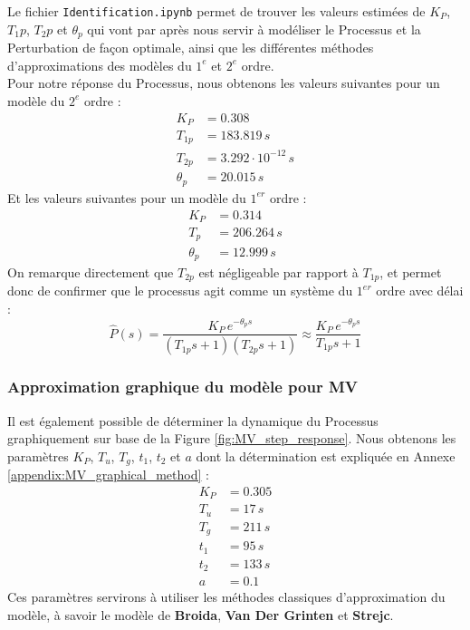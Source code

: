 \documentclass{article}
\begin{document}
Le fichier \texttt{Identification.ipynb} permet de trouver les valeurs estimées de $K_P$, $T_1p$, $T_2p$ et $\theta_p$ qui vont par après nous servir à modéliser le Processus et la Perturbation de façon optimale, ainsi que les différentes méthodes d'approximations des modèles du $1^{e}$ et $2^{e}$ ordre.\\
Pour notre réponse du Processus, nous obtenons les valeurs suivantes pour un modèle du $2^{e}$ ordre :
\begin{align*}
    K_P &= 0.308 \\
    T_{1p} &= 183.819 \,s \\
    T_{2p} &= 3.292 \cdot 10^{-12} \,s \\
    \theta_p &= 20.015 \,s
\end{align*}
Et les valeurs suivantes pour un modèle du $1^{er}$ ordre :
\begin{align*}
    K_P &= 0.314 \\
    T_{p} &= 206.264 \,s \\
    \theta_p &= 12.999 \,s
\end{align*}
On remarque directement que $T_{2p}$ est négligeable par rapport à $T_{1p}$, et permet donc de confirmer que le processus agit comme un système du $1^{er}$ ordre avec délai :
\begin{equation}
    \hat{P}(s) = \frac{K_P\,e^{-\theta_p s}}{(T_{1p}s + 1)(T_{2p}s + 1)} \approx \frac{K_P\,e^{-\theta_p s}}{T_{1p}s + 1}
\end{equation}

\subsubsection{Approximation graphique du modèle pour MV}

Il est également possible de déterminer la dynamique du Processus graphiquement sur base de la Figure \ref{fig:MV_step_response}.
Nous obtenons les paramètres $K_P$, $T_u$, $T_g$, $t_1$, $t_2$ et $a$ dont la détermination est expliquée en Annexe \ref{appendix:MV_graphical_method} :
\begin{align*}
    K_P &= 0.305 \\
    T_u &= 17 \,s \\
    T_g &= 211 \,s \\
    t_1 &= 95 \,s \\
    t_2 &= 133 \,s \\
    a &= 0.1
\end{align*}
Ces paramètres servirons à utiliser les méthodes classiques d'approximation du modèle, à savoir le modèle de \textbf{Broida}, \textbf{Van Der Grinten} et \textbf{Strejc}.
\end{document}
